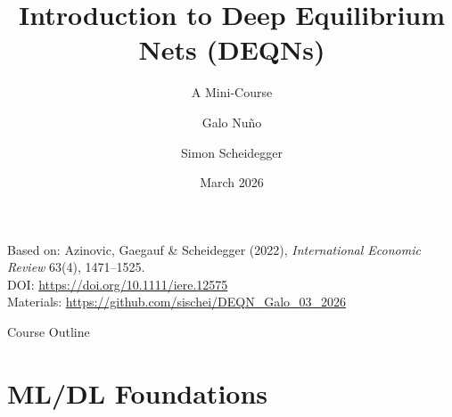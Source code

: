 \documentclass[aspectratio=169,11pt]{beamer}
\title[DEQNs --- Mini-Course]%
{Introduction to Deep Equilibrium Nets (DEQNs)}
\subtitle{A Mini-Course}
\author{Galo Nu\~{n}o \and Simon Scheidegger}
\institute[Banco de Espa\~{n}a \& HEC Lausanne]{Banco de Espa\~{n}a \and HEC, University of Lausanne}
\date{March 2026}
\begin{document}

{
\begin{frame}
\titlepage
\vspace{-0.4cm}
\begin{center}
{\footnotesize Based on: Azinovic, Gaegauf \& Scheidegger (2022), \emph{International Economic Review} 63(4), 1471--1525.\\
DOI: \url{https://doi.org/10.1111/iere.12575}}\\[4pt]
{\footnotesize Materials: \url{https://github.com/sischei/DEQN_Galo_03_2026}}
\end{center}
\end{frame}
}

\begin{frame}{Course Outline}
\tableofcontents
\end{frame}



\section{ML/DL Foundations}
\end{document}
